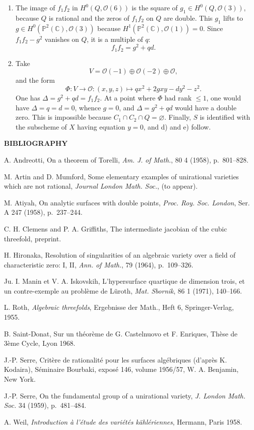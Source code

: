\documentclass[10pt]{article}
\newcommand{\CC}{\mathbb C}
\newcommand{\PP}{\mathbb P}
\newcommand{\cO}{\mathcal O}
\begin{document}
\begin{enumerate}[label=\arabic*)]
\item The image of \(f_1f_2\) in \(H^0(Q,\cO(6))\) is the square of
\(g_1\in H^0(Q,\cO(3))\), because \(Q\) is rational and the zeros of
\(f_1f_2\) on \(Q\) are double. This \(g_1\) lifts to
\(g\in H^0(\PP^2(\CC),\cO(3))\) because
\(H^1(\PP^2(\CC),\cO(1))=0\). Since \(f_1f_2-g^2\) vanishes on \(Q\), it is a
multiple of \(q\):
\[
  f_1f_2=g^2+qd.
\]
\item Take
\[
  V=\cO(-1)\oplus\cO(-2)\oplus\cO,
\]
and the form
\[
  \Phi:V\longrightarrow\cO:(x,y,z)\longmapsto
  qx^2+2gxy-dy^2-z^2.
\]
One has \(\Delta=g^2+qd=f_1f_2\). At a point where \(\Phi\) had rank \(\leq1\),
one would have \(\Delta=q=d=0\), whence \(g=0\), and
\(\Delta=g^2+qd\) would have a double zero. This is impossible because
\(C_1\cap C_2\cap Q=\varnothing\). Finally, \(S\) is identified with the
subscheme of \(X\) having equation \(y=0\), and d) and e) follow.
\end{enumerate}

\begin{center}\bfseries BIBLIOGRAPHY\end{center}
\begin{enumerate}[label={\textup{[\arabic*]}}]
\item A. Andreotti, On a theorem of Torelli, \emph{Am. J. of Math.}, 80 4
(1958), p.~801--828.
\item M. Artin and D. Mumford, Some elementary examples of unirational
varieties which are not rational, \emph{Journal London Math. Soc.}, (to
appear).
\item M. Atiyah, On analytic surfaces with double points, \emph{Proc. Roy. Soc.
London}, Ser. A 247 (1958), p.~237--244.
\item C. H. Clemens and P. A. Griffiths, The intermediate jacobian of the cubic
threefold, preprint.
\item H. Hironaka, Resolution of singularities of an algebraic variety over a
field of characteristic zero: I, II, \emph{Ann. of Math.}, 79 (1964),
p.~109--326.
\item Ju. I. Manin et V. A. Iskovskih, L'hypersurface quartique de dimension
trois, et un contre-exemple au problème de Lüroth, \emph{Mat. Sbornik}, 86 1
(1971), 140--166.
\item L. Roth, \emph{Algebraic threefolds}, Ergebnisse der Math., Heft 6,
Springer-Verlag, 1955.
\item B. Saint-Donat, Sur un théorème de G. Castelnuovo et F. Enriques, Thèse
de 3ème Cycle, Lyon 1968.
\item J.-P. Serre, Critère de rationalité pour les surfaces algébriques
(d'après K. Kodaira), Séminaire Bourbaki, exposé 146, volume 1956/57, W. A.
Benjamin, New York.
\item J.-P. Serre, On the fundamental group of a unirational variety,
\emph{J. London Math. Soc.} 34 (1959), p.~481--484.
\item A. Weil, \emph{Introduction à l'étude des variétés kählériennes},
Hermann, Paris 1958.
\end{enumerate}
\end{document}
